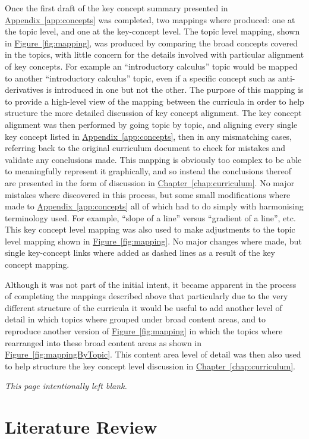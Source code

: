 \documentclass[twoside,12pt,a4paper]{report}
\makeatletter
\newcommand*{\intentionallyblankpage}{
  \vspace*{\fill}
  {\centering \textit{This page intentionally left blank.} \par}
  \vspace{\fill}}
\renewcommand*{\cleardoublepage}{\clearpage\if@twoside \ifodd\c@page\else
  \intentionallyblankpage
  \newpage
  \if@twocolumn\hbox{}\newpage\fi\fi\fi}
\newcommand{\refchap}[1]{\hyperref[chap:#1]{Chapter~\ref{chap:#1}}}
\newcommand{\reffig}[1]{\hyperref[fig:#1]{Figure~\ref{fig:#1}}}
\newcommand{\refapp}[1]{\hyperref[app:#1]{Appendix~\ref{app:#1}}}
\makeatother
\begin{document}
Once the first draft of the key concept summary presented in \refapp{concepts} was completed, two mappings where produced: one at the topic level, and one at the key-concept level. The topic level mapping, shown in \reffig{mapping}, was produced by comparing the broad concepts covered in the topics, with little concern for the details involved with particular alignment of key concepts. For example an ``introductory calculus'' topic would be mapped to another ``introductory calculus'' topic, even if a specific concept such as anti-derivatives is introduced in one but not the other. The purpose of this mapping is to provide a high-level view of the mapping between the curricula in order to help structure the more detailed discussion of key concept alignment. The key concept alignment was then performed by going topic by topic, and aligning every single key concept listed in \refapp{concepts}, then in any mismatching cases, referring back to the original curriculum document to check for mistakes and validate any conclusions made. This mapping is obviously too complex to be able to meaningfully represent it graphically, and so instead the conclusions thereof are presented in the form of discussion in \refchap{curriculum}. No major mistakes where discovered in this process, but some small modifications where made to \refapp{concepts} all of which had to do simply with harmonising terminology used. For example, ``slope of a line'' versus ``gradient of a line'', etc. This key concept level mapping was also used to make adjustments to the topic level mapping shown in \reffig{mapping}. No major changes where made, but single key-concept links where added as dashed lines as a result of the key concept mapping. 

Although it was not part of the initial intent, it became apparent in the process of completing the mappings described above that particularly due to the very different structure of the curricula it would be useful to add another level of detail in which topics where grouped under broad content areas, and to reproduce another version of \reffig{mapping} in which the topics where rearranged into these broad content areas as shown in \reffig{mappingByTopic}. This content area level of detail was then also used to help structure the key concept level discussion in \refchap{curriculum}.




\cleardoublepage
\chapter{Literature Review}
\label{chap:literature}
\end{document}
